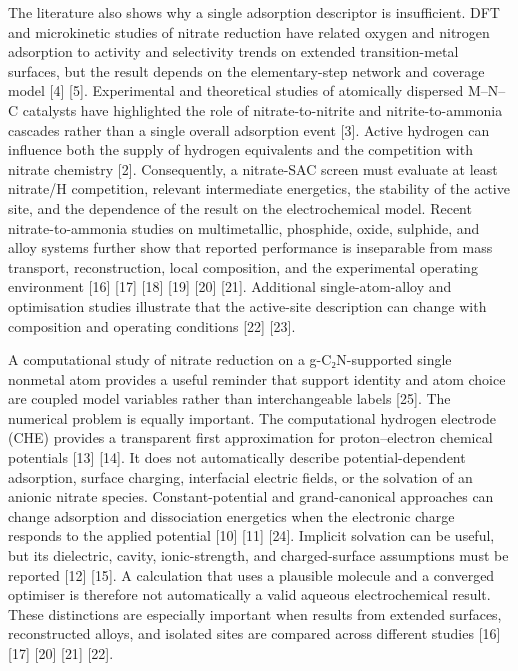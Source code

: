\documentclass[
]{article}
\begin{document}
The literature also shows why a single adsorption descriptor is
insufficient. DFT and microkinetic studies of nitrate reduction have
related oxygen and nitrogen adsorption to activity and selectivity
trends on extended transition-metal surfaces, but the result depends on
the elementary-step network and coverage model {[}4{]} {[}5{]}.
Experimental and theoretical studies of atomically dispersed M--N--C
catalysts have highlighted the role of nitrate-to-nitrite and
nitrite-to-ammonia cascades rather than a single overall adsorption
event {[}3{]}. Active hydrogen can influence both the supply of hydrogen
equivalents and the competition with nitrate chemistry {[}2{]}.
Consequently, a nitrate-SAC screen must evaluate at least nitrate/H
competition, relevant intermediate energetics, the stability of the
active site, and the dependence of the result on the electrochemical
model. Recent nitrate-to-ammonia studies on multimetallic, phosphide,
oxide, sulphide, and alloy systems further show that reported
performance is inseparable from mass transport, reconstruction, local
composition, and the experimental operating environment {[}16{]}
{[}17{]} {[}18{]} {[}19{]} {[}20{]} {[}21{]}. Additional
single-atom-alloy and optimisation studies illustrate that the
active-site description can change with composition and operating
conditions {[}22{]} {[}23{]}.

A computational study of nitrate reduction on a g-C₂N-supported single
nonmetal atom provides a useful reminder that support identity and atom
choice are coupled model variables rather than interchangeable labels
{[}25{]}. The numerical problem is equally important. The computational
hydrogen electrode (CHE) provides a transparent first approximation for
proton--electron chemical potentials {[}13{]} {[}14{]}. It does not
automatically describe potential-dependent adsorption, surface charging,
interfacial electric fields, or the solvation of an anionic nitrate
species. Constant-potential and grand-canonical approaches can change
adsorption and dissociation energetics when the electronic charge
responds to the applied potential {[}10{]} {[}11{]} {[}24{]}. Implicit
solvation can be useful, but its dielectric, cavity, ionic-strength, and
charged-surface assumptions must be reported {[}12{]} {[}15{]}. A
calculation that uses a plausible molecule and a converged optimiser is
therefore not automatically a valid aqueous electrochemical result.
These distinctions are especially important when results from extended
surfaces, reconstructed alloys, and isolated sites are compared across
different studies {[}16{]} {[}17{]} {[}20{]} {[}21{]} {[}22{]}.
\end{document}
